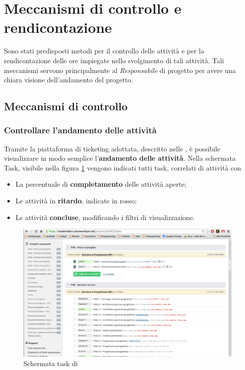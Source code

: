 \section{Meccanismi di controllo e rendicontazione}
Sono stati predisposti metodi per il controllo delle attività e per la rendicontazione delle ore impiegate nello svolgimento di tali attività. Tali meccanismi servono principalmente al \emph{Responsabile} di progetto per avere una chiara visione dell'andamento del progetto.
\subsection{Meccanismi di controllo}
\subsubsection{Controllare l'andamento delle attività}

Tramite la piattaforma di ticketing adottata, descritto nelle \NormeDiProgetto, è possibile visualizzare in modo semplice l'\textbf{andamento delle attività}.
Nella schermata Task, visibile nella figura \ref{teamworkpmtask} vengono indicati tutti task, correlati di attività con
\begin{itemize}
\item La percentuale di \textbf{completamento} delle attività aperte;
\item Le attività in \textbf{ritardo}, indicate in rosso;
\item Le attività \textbf{concluse}, modificando i filtri di visualizzazione.
\end{itemize}
 
\begin{figure}[H]
\centering \includegraphics[scale=0.3]{gantt/task-list.png}
\caption{Schermata task di  \label{teamworkpmtask}}
\end{figure}


